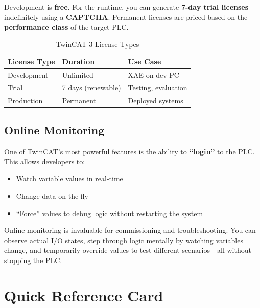 \documentclass[11pt,a4paper]{article}
\begin{document}
Development is \textbf{free}. For the runtime, you can generate \textbf{7-day trial licenses} indefinitely using a \textbf{CAPTCHA}. Permanent licenses are priced based on the \textbf{performance class} of the target PLC.

\begin{table}[h]
\centering
\begin{tabular}{@{}lll@{}}
\toprule
\textbf{License Type} & \textbf{Duration} & \textbf{Use Case} \\
\midrule
Development & Unlimited & XAE on dev PC \\
Trial & 7 days (renewable) & Testing, evaluation \\
Production & Permanent & Deployed systems \\
\bottomrule
\end{tabular}
\caption{TwinCAT 3 License Types}
\end{table}

\subsection{Online Monitoring}

One of TwinCAT's most powerful features is the ability to \textbf{``login''} to the PLC. This allows developers to:

\begin{itemize}[leftmargin=*]
    \item Watch variable values in real-time
    \item Change data on-the-fly
    \item ``Force'' values to debug logic without restarting the system
\end{itemize}

\begin{notebox}
Online monitoring is invaluable for commissioning and troubleshooting. You can observe actual I/O states, step through logic mentally by watching variables change, and temporarily override values to test different scenarios---all without stopping the PLC.
\end{notebox}

\section*{Quick Reference Card}
\end{document}
